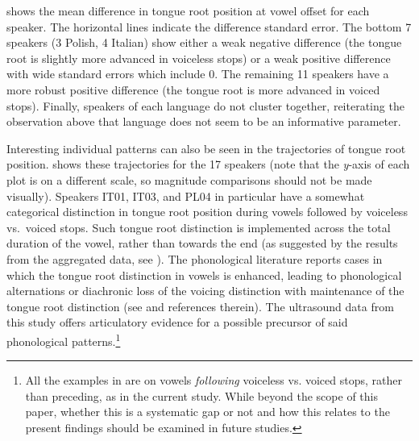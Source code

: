 \documentclass[12pt,]{article}
\let\rmarkdownfootnote\footnote%
\def\footnote{\protect\rmarkdownfootnote}
\begin{document}
 shows the mean difference in tongue root
position at vowel offset for each speaker. The horizontal lines indicate
the difference standard error. The bottom 7 speakers (3 Polish, 4
Italian) show either a weak negative difference (the tongue root is
slightly more advanced in voiceless stops) or a weak positive difference
with wide standard errors which include 0. The remaining 11 speakers
have a more robust positive difference (the tongue root is more advanced
in voiced stops). Finally, speakers of each language do not cluster
together, reiterating the observation above that language does not seem
to be an informative parameter.

Interesting individual patterns can also be seen in the trajectories of
tongue root position.  shows these
trajectories for the 17 speakers (note that the \emph{y}-axis of each
plot is on a different scale, so magnitude comparisons should not be
made visually). Speakers IT01, IT03, and PL04 in particular have a
somewhat categorical distinction in tongue root position during vowels
followed by voiceless vs.~voiced stops. Such tongue root distinction is
implemented across the total duration of the vowel, rather than towards
the end (as suggested by the results from the aggregated data, see
). The phonological literature reports cases in which the
tongue root distinction in vowels is enhanced, leading to phonological
alternations or diachronic loss of the voicing distinction with
maintenance of the tongue root distinction (see \citet{vaux1996} and
references therein). The ultrasound data from this study offers
articulatory evidence for a possible precursor of said phonological
patterns.\footnote{All the examples in \citet{vaux1996} are on vowels \textit{following} voiceless vs. voiced stops, rather than preceding, as in the current study. While beyond the scope of this paper, whether this is a systematic gap or not and how this relates to the present findings should be examined in future studies.}
\end{document}
